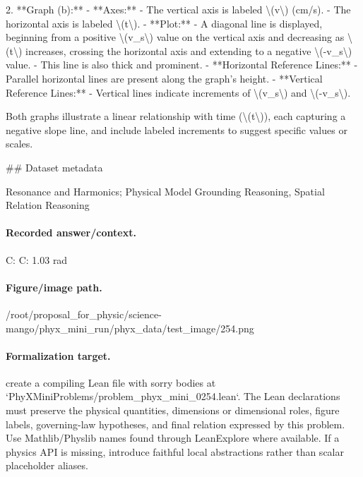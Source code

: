 2. **Graph (b):**
   - **Axes:**
     - The vertical axis is labeled \textbackslash{}(v\textbackslash{}) (cm/s).
     - The horizontal axis is labeled \textbackslash{}(t\textbackslash{}).
   - **Plot:**
     - A diagonal line is displayed, beginning from a positive \textbackslash{}(v\_s\textbackslash{}) value on the vertical axis and decreasing as \textbackslash{}(t\textbackslash{}) increases, crossing the horizontal axis and extending to a negative \textbackslash{}(-v\_s\textbackslash{}) value.
     - This line is also thick and prominent.
   - **Horizontal Reference Lines:**
     - Parallel horizontal lines are present along the graph’s height.
   - **Vertical Reference Lines:**
     - Vertical lines indicate increments of \textbackslash{}(v\_s\textbackslash{}) and \textbackslash{}(-v\_s\textbackslash{}).

Both graphs illustrate a linear relationship with time (\textbackslash{}(t\textbackslash{})), each capturing a negative slope line, and include labeled increments to suggest specific values or scales.

\#\# Dataset metadata

Resonance and Harmonics; Physical Model Grounding Reasoning, Spatial Relation Reasoning

\paragraph{Recorded answer/context.}
C: C: 1.03 rad

\paragraph{Figure/image path.}
/root/proposal\_for\_physic/science-mango/phyx\_mini\_run/phyx\_data/test\_image/254.png

\paragraph{Formalization target.}
create a compiling Lean file with sorry bodies at `PhyXMiniProblems/problem\_phyx\_mini\_0254.lean`. The Lean declarations must preserve the physical quantities, dimensions or dimensional roles, figure labels, governing-law hypotheses, and final relation expressed by this problem.
Use Mathlib/Physlib names found through LeanExplore where available. If a physics API is missing, introduce faithful local abstractions rather than scalar placeholder aliases.

